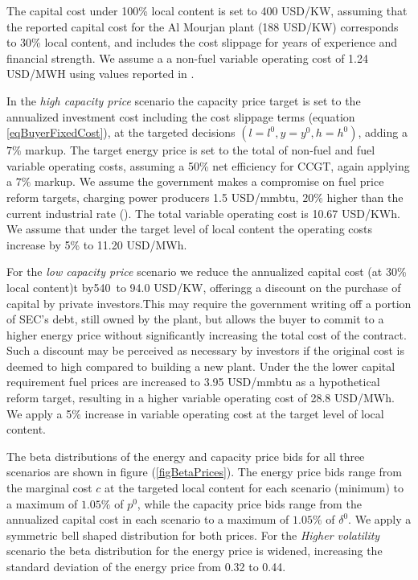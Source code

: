 \documentclass[informs]{informs3}
\begin{document}
The capital cost under 100\% local content is set to 400 USD/KW, assuming that the reported capital cost for the Al Mourjan plant (188 USD/KW) corresponds to 30\%  local content, and includes the cost slippage for years of experience and financial strength. We assume a a non-fuel variable operating cost of 1.24 USD/MWH using values reported in \cite{Rioux_et_al_2017}.

In the \textit{high capacity price} scenario the capacity price target is set to the annualized investment cost including the cost slippage terms (equation \ref{eqBuyerFixedCost}), at the targeted decisions $(l=l^{0}, y=y^{0}, h=h^{0})$,  adding a $7\%$ markup. The target energy price is set to the total of non-fuel and fuel variable operating costs, assuming a 50\% net efficiency for CCGT, again applying a $7\%$ markup.  We assume the government makes a compromise on fuel price reform targets, charging power producers 1.5 USD/mmbtu, $20\%$ higher than the current industrial rate (\citealp{Fattouh_2018}). The total variable operating cost is 10.67 USD/KWh. We assume that under the target level of local content the operating costs increase by 5\% to 11.20 USD/MWh.

For the \textit{low capacity price} scenario we reduce the annualized capital cost (at 30\% local content)t by540\ to 94.0 USD/KW, offeringg a discount on the purchase of capital by private investors.This may require the government writing off a portion of SEC’s debt, still owned by the plant, but allows the buyer to commit to a higher energy price without significantly increasing the total cost of the contract.  Such a discount may be perceived as necessary by investors if the original cost is deemed to high compared to building a new plant. Under the the lower capital requirement fuel prices are increased to 3.95 USD/mmbtu as a hypothetical reform target, resulting in a higher variable operating cost of 28.8 USD/MWh. We apply a 5\% increase in variable operating cost at the target level of local content.


The beta distributions of the energy and capacity price bids for all three scenarios are shown in figure (\ref{figBetaPrices}). The energy price bids range from the marginal cost $c$ at the targeted local content for each scenario (minimum) to a maximum of $1.05\%$ of $p^0$, while the capacity price bids range from the annualized capital cost in each scenario to a maximum of $1.05\%$ of $\delta^0$. We apply a symmetric bell shaped distribution for both prices. For the \textit{Higher volatility} scenario the beta distribution for the energy price is widened, increasing the standard deviation of the energy price from 0.32 to 0.44.
\end{document}
